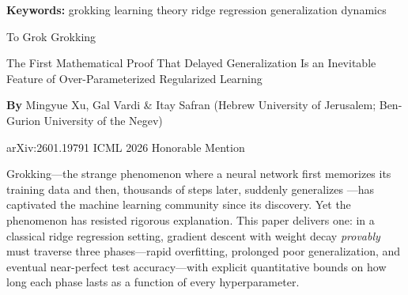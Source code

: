 \documentclass[10pt,twocolumn]{article}
\begin{document}
\setlength{\parindent}{0pt}
\setlength{\parskip}{4pt}

{\small\color{keywordgray}\textbf{Keywords:}
  grokking \textbullet{}
  learning theory \textbullet{}
  ridge regression \textbullet{}
  generalization dynamics}\par\vspace{4pt}

{\LARGE\bfseries\raggedright
  To Grok Grokking}\par\vspace{4pt}

{\large\itshape\raggedright
  The First Mathematical Proof That Delayed
  Generalization Is an Inevitable Feature of
  Over-Parameterized Regularized Learning}\par\vspace{6pt}

{\small\textbf{By} Mingyue Xu, Gal Vardi \& Itay Safran
  (Hebrew University of Jerusalem; Ben-Gurion University of the Negev)}\par\vspace{2pt}

{\small\color{keywordgray}arXiv:2601.19791 \textbullet{}
  ICML 2026 Honorable Mention}
\par\vspace{2pt}\noindent{\color{rulered}\rule{\columnwidth}{0.6pt}}\vspace{6pt}

Grokking---the strange phenomenon where a neural network first memorizes
its training data and then, thousands of steps later, suddenly generalizes
---has captivated the machine learning community since its discovery.
Yet the phenomenon has resisted rigorous explanation. This paper delivers
one: in a classical ridge regression setting, gradient descent with
weight decay \emph{provably} must traverse three phases---rapid overfitting,
prolonged poor generalization, and eventual near-perfect test accuracy---with
explicit quantitative bounds on how long each phase lasts as a function
of every hyperparameter.
\end{document}
